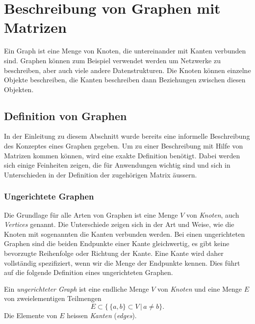 %
%
%
\section{Beschreibung von Graphen mit Matrizen
\label{buch:section:beschreibung-von-graphen-mit-matrizen}}
Ein Graph ist eine Menge von Knoten, die untereinander mit Kanten
verbunden sind.
Graphen können zum Beispiel verwendet werden um Netzwerke zu beschreiben,
aber auch viele andere Datenstrukturen.
Die Knoten können einzelne Objekte beschreiben, die Kanten beschreiben
dann Beziehungen zwischen diesen Objekten.

\subsection{Definition von Graphen
\label{subsection:definition-von-graphen}}
In der Einleitung zu diesem Abschnitt wurde bereits eine informelle
Beschreibung des Konzeptes eines Graphen gegeben.
Um zu einer Beschreibung mit Hilfe von Matrizen kommen können,
wird eine exakte Definition benötigt.
Dabei werden sich einige Feinheiten zeigen, die für Anwendungen wichtig
sind und sich in Unterschieden in der Definition der zugehörigen Matrix 
äussern.

\subsubsection{Ungerichtete Graphen}
Die Grundlage für alle Arten von Graphen ist eine Menge $V$ von {\em Knoten},
auch {\em Vertices} genannt.
%
%
Die Unterschiede zeigen sich in der Art und Weise, wie die Knoten
mit sogenannten die Kanten 
%
verbunden werden.
Bei einen ungerichteten Graphen sind die beiden Endpunkte einer Kante
gleichwertig, es gibt keine bevorzugte Reihenfolge oder Richtung der
Kante.
Eine Kante wird daher vollständig spezifiziert, wenn wir die
Menge der Endpunkte kennen.
Dies führt auf die folgende Definition eines ungerichteten Graphen.

\begin{definition}
\label{buch:def:ungerichteter-graph}
%
%
Ein {\em ungerichteter Graph} ist eine endliche Menge $V$ von {\em Knoten}
und eine Menge $E$ von zweielementigen Teilmengen 
\[
E \subset \{\, \{a,b\}\subset V\,|\, a\ne b\}.
\]
Die Elemente von $E$ heissen {\em Kanten} ({\em edges}).
\end{definition}

